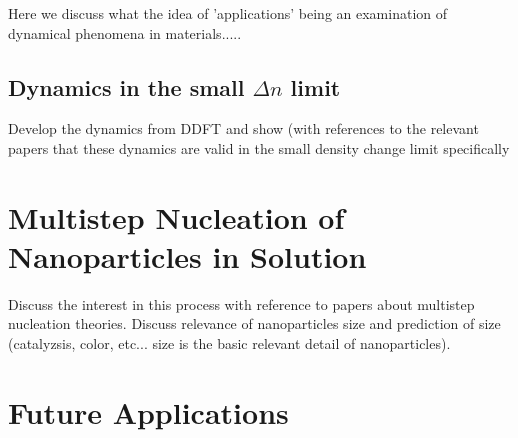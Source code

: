 \label{applications}

{
    \color{ForestGreen} Here we discuss what the idea of 'applications' being
    an examination of dynamical phenomena in materials.....
}

\subsection{Dynamics in the small $\Delta n$ limit} %

{
    \color{ForestGreen} Develop the dynamics from DDFT and show (with references
    to the relevant papers that these dynamics are valid in the small density
    change limit specifically
}

\section{Multistep Nucleation of Nanoparticles in Solution} %

{
    \color{ForestGreen} Discuss the interest in this process with reference to 
    papers about multistep nucleation theories. Discuss relevance of nanoparticles
    size and prediction of size (catalyzsis, color, etc... size is the basic relevant
    detail of nanoparticles).
}

\section{Future Applications} %

